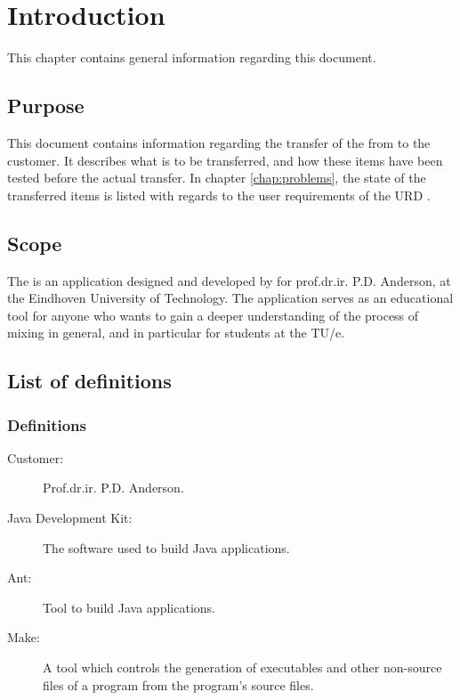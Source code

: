 \chapter{Introduction}
This chapter contains general information regarding this document.

\section{Purpose}
This document contains information regarding the transfer of the \applicationname{} from \projectauthor{} to the customer. It describes what is to be transferred, and how these items have been tested before the actual transfer. In chapter \ref{chap:problems}, the state of the transferred items is listed with regards to the user requirements of the URD \cite{urd}.

\section{Scope}
The \applicationname{} is an application designed and developed by \projectauthor{} for prof.dr.ir. P.D. Anderson, at the Eindhoven University of Technology. The application serves as an educational tool for anyone who wants to gain a deeper understanding of the process of mixing in general, and in particular for students at the TU/e.

\section{List of definitions}
\subsection{Definitions}
\begin{description}
\item[Customer:] Prof.dr.ir. P.D. Anderson.
\item[Java Development Kit:] The software used to build Java applications.
\item[Ant:] Tool to build Java applications.
\item[Make:] A tool which controls the generation of executables and other non-source files of a program from the program's source files.
\end{description}

